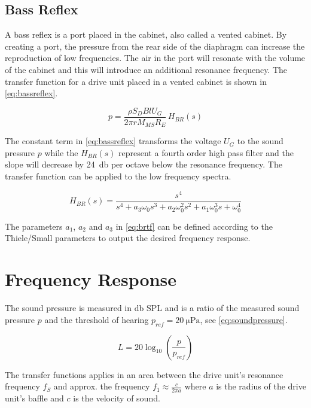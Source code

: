 \subsection{Bass Reflex}
A bass reflex is a port placed in the cabinet, also called a vented cabinet.
By creating a port, the pressure from the rear side of the diaphragm can increase the reproduction of low frequencies.
The air in the port will resonate with the volume of the cabinet and this will introduce an additional resonance frequency. \cite[p.~53]{Elektroakustik}
The transfer function for a drive unit placed in a vented cabinet is shown in \cref{eq:bassreflex}.

\begin{equation}
p = \frac{\rho S_D B l U_G}{2\pi r M_{MS} R_E}\,H_{BR}(s)
\label{eq:bassreflex}
\end{equation}

The constant term in \cref{eq:bassreflex} transforms the voltage $U_G$ to the sound pressure $p$ while the $H_{BR}(s)$ represent a fourth order high pass filter and the slope will decrease by \SI{24}{\decibel} per octave below the resonance frequency. The transfer function can be applied to the low frequency spectra. 

\begin{equation}
H_{BR}(s) = \frac{s^4}{s^4+a_3\omega_0s^3+a_2\omega_0^2s^2+a_1\omega_0^3s+\omega_0^4}
\label{eq:brtf}
\end{equation}

The parameters $a_1$, $a_2$ and $a_3$ in \cref{eq:brtf} can be defined according to the Thiele/Small parameters to output the desired frequency response. \cite[p.~55]{Elektroakustik}

\section{Frequency Response}
The sound pressure is measured in \si{\decibel} SPL and is a ratio of the measured sound pressure $p$ and the threshold of hearing $p_{ref}=\SI{20}{\micro\pascal}$, see \cref{eq:soundpressure}.

\begin{equation}
L=20\log_{10}\left(\frac{p}{p_{ref}}\right)
\label{eq:soundpressure}
\end{equation}

The transfer functions applies in an area between the drive unit's resonance frequency $f_S$ and approx. the frequency $f_1\approx\frac{c}{2\pi a}$ where $a$ is the radius of the drive unit's baffle and $c$ is the velocity of sound. \cite[p.~41]{Elektroakustik}



\FloatBarrier
